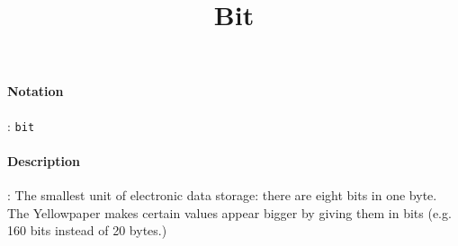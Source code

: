 \documentclass[10pt,a4paper,oneside]{scrartcl}
\author{}
\title{Bit}
\date{}
\begin{document}
\maketitle
\paragraph{Notation}: \texttt{bit}
\paragraph{Description}: The smallest unit of electronic data storage: there are eight bits in one byte. The Yellowpaper makes certain values appear bigger by giving them in bits (e.g. 160 bits instead of 20 bytes.)
\end{document}
